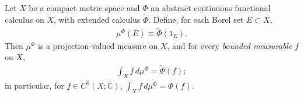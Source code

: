 \begin{theorem}
    \label{thrm:abstract-calculus-yields-pvm}
    \leanok
    Let $X$ be a compact metric space and $\Phi$ an abstract continuous functional calculus on $X$, with extended calculus $\widetilde\Phi$. Define, for each Borel set $E \subset X$,
    \begin{align}
        \mu^\Phi(E) \equiv \widetilde\Phi(1_E).
    \end{align}
    Then $\mu^\Phi$ is a projection-valued measure on $X$, and for every \textit{bounded measurable} $f$ on $X$,
    \begin{align}
        \int_X f \, d\mu^\Phi = \widetilde\Phi(f);
    \end{align}
    in particular, for $f \in C^0(X;\mathbb{C})$, $\int_X f \, d\mu^\Phi = \Phi(f)$.
\end{theorem}
